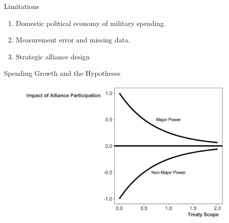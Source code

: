 \documentclass{beamer}
\begin{document}

\appendix 



\begin{frame}{Limitations}

\begin{enumerate}
\item Domestic political economy of military spending. 
\item Measurement error and missing data. 
\item Strategic alliance design
\end{enumerate}

\end{frame}



\begin{frame}{Spending Growth and the Hypotheses}

\begin{figure}
	\centering
		\includegraphics[width=0.95\textwidth]{illus-arg.png}
	\label{fig:illus-arg}
\end{figure}


\end{frame}


\end{document}

